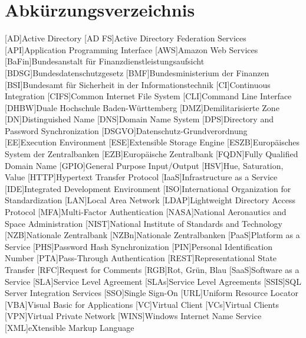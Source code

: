 
\chapter{Abkürzungsverzeichnis}
\begin{acronym}[WHATWG ]
\setlength{\itemsep}{-\parsep}
[AD]{Active Directory}
[AD FS]{Active Directory Federation Services}
[API]{Application Programming Interface}
[AWS]{Amazon Web Services}
[BaFin]{Bundesanstalt für Finanzdienstleistungsaufsicht}
[BDSG]{Bundesdatenschutzgesetz}
[BMF]{Bundesministerium der Finanzen}
[BSI]{Bundesamt für Sicherheit in der Informationstechnik}
[CI]{Continuous Integration}
[CIFS]{Common Internet File System}
[CLI]{Command Line Interface}
[DHBW]{Duale Hochschule Baden-Württemberg}
[DMZ]{Demilitarisierte Zone}
[DN]{Distinguished Name}
[DNS]{Domain Name System}
[DPS]{Directory and Password Synchronization}
[DSGVO]{Datenschutz-Grundverordnung}
[EE]{Execution Environment}
[ESE]{Extensible Storage Engine}
[ESZB]{Europäisches System der Zentralbanken}
[EZB]{Europäische Zentralbank}
[FQDN]{Fully Qualified Domain Name}
[GPIO]{General Purpose Input/Output}
[HSV]{Hue, Saturation, Value}
[HTTP]{Hypertext Transfer Protocol}
[IaaS]{Infrastructure as a Service}
[IDE]{Integrated Development Environment}
[ISO]{International Organization for Standardization}
[LAN]{Local Area Network}
[LDAP]{Lightweight Directory Access Protocol}
[MFA]{Multi-Factor Authentication}
[NASA]{National Aeronautics and Space Administration}
[NIST]{National Institute of Standards and Technology}
[NZB]{Nationale Zentralbank}
[NZBn]{Nationale Zentralbanken}
[PaaS]{Platform as a Service}
[PHS]{Password Hash Synchronization}
[PIN]{Personal Identification Number}
[PTA]{Pass-Through Authentication}
[REST]{Representational State Transfer}
[RFC]{Request for Comments}
[RGB]{Rot, Grün, Blau}
[SaaS]{Software as a Service}
[SLA]{Service Level Agreement}
[SLAs]{Service Level Agreements}
[SSIS]{SQL Server Integration Services}
[SSO]{Single Sign-On}
[URL]{Uniform Resource Locator}
[VBA]{Visual Basic for Applications}
[VC]{Virtual Client}
[VCs]{Virtual Clients}
[VPN]{Virtual Private Network}
[WINS]{Windows Internet Name Service}
[XML]{eXtensible Markup Language}
\end{acronym}